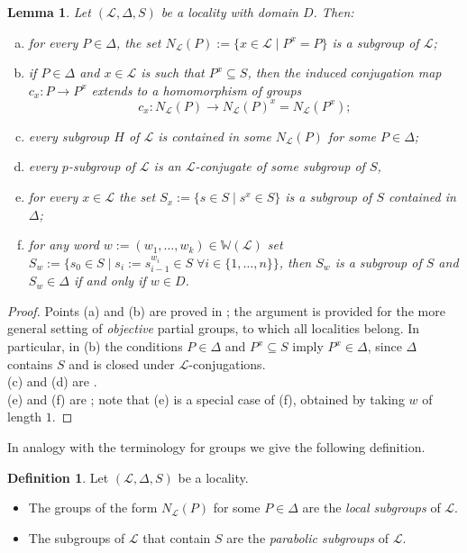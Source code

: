 \documentclass{amsart}
\numberwithin{equation}{section}
\newtheorem{lemma}[equation]{Lemma}
\theoremstyle{definition}
\newtheorem{definition}[equation]{Definition}
\theoremstyle{subresult}
\theoremstyle{caseresult}
\newcommand{\W}{\mathbb{W}}
\renewcommand{\L}{\mathcal{L}}
\newcommand{\fto}{\longrightarrow}
\newcommand{\<}{\langle}
\renewcommand{\>}{\rangle}
\begin{document}
\begin{lemma}\label{lemma:properties of localities}
    Let $(\L,\Delta,S)$ be a locality with domain $D$. Then:
    \begin{enumerate}[(a)]
        \item for every $P \in \Delta$, the set $N_\L(P):= \{ x \in \L \mid P^x = P\}$ is a subgroup of $\L$;
        \item if $P \in \Delta$ and $x \in \L$ is such that $P^x \subseteq S$, then the induced conjugation map $c_x: P \fto P^x$ extends to a homomorphism of groups
        \[
        c_x : N_\L(P) \fto N_\L(P)^x = N_\L(P^x);
        \]
        \item every subgroup $H$ of $\L$ is contained in some $N_\L(P)$ for some $P \in \Delta$;
        \item every $p$-subgroup of $\L$ is an $\L$-conjugate of some subgroup of $S$,
        \item for every $x \in \L$ the set $S_x:= \{ s \in S \mid s^x \in S \}$ is a subgroup of $S$ contained in $\Delta$;
        \item for any word $w:=(w_1,\dots,w_k) \in \W(\L)$ set $S_w := \{s_0 \in S \mid s_i := s_{i-1}^{w_i} \in S \; \forall i \in \{1,\dots,n\} \}$, then $S_w$ is a subgroup of $S$ and $S_w \in \Delta$ if and only if $w \in D$.
    \end{enumerate}
\end{lemma}
\begin{proof}
    Points (a) and (b) are proved in \cite[Lemma 2.7]{Chermak:2013}; the argument is provided for the more general setting of \emph{objective} partial groups, to which all localities belong. In particular, in (b) the conditions $P \in \Delta$ and $P^x \subseteq S$ imply $P^x \in \Delta$, since $\Delta$ contains $S$ and is closed under $\L$-conjugations.\\
    (c) and (d) are \cite[Proposition 2.22]{Chermak:2013}.\\
    (e) and (f) are \cite[Lemma 2.14]{Chermak:2013}; note that (e) is a special case of (f), obtained by taking $w$ of length $1$.
\end{proof}

In analogy with the terminology for groups we give the following definition.
\begin{definition}
	\label{def:local and parabolic of localities}
	Let $(\L,\Delta,S)$ be a locality.
	\begin{itemize}
		\item The groups of the form $N_\L(P)$ for some $P \in \Delta$ are the \emph{local subgroups} of $\L$.
		\item The subgroups of $\L$ that contain $S$ are the \emph{parabolic subgroups} of $\L$.
	\end{itemize}
\end{definition}
\end{document}
